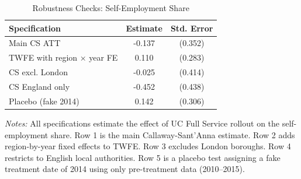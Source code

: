 
\begin{table}[htbp]
\centering
\caption{Robustness Checks: Self-Employment Share}
\label{tab:robustness}
\begin{tabular}{lcc}
\toprule
Specification & Estimate & Std. Error \\
\midrule
Main CS ATT & -0.137 & (0.352) \\
TWFE with region × year FE & 0.110 & (0.283) \\
CS excl. London & -0.025 & (0.414) \\
CS England only & -0.452 & (0.438) \\
Placebo (fake 2014) & 0.142 & (0.306) \\

\bottomrule
\end{tabular}
\begin{tablenotes}
\small
\item \textit{Notes:} All specifications estimate the effect of UC Full Service rollout on the self-employment share. Row 1 is the main Callaway-Sant'Anna estimate. Row 2 adds region-by-year fixed effects to TWFE. Row 3 excludes London boroughs. Row 4 restricts to English local authorities. Row 5 is a placebo test assigning a fake treatment date of 2014 using only pre-treatment data (2010--2015).
\end{tablenotes}
\end{table}

